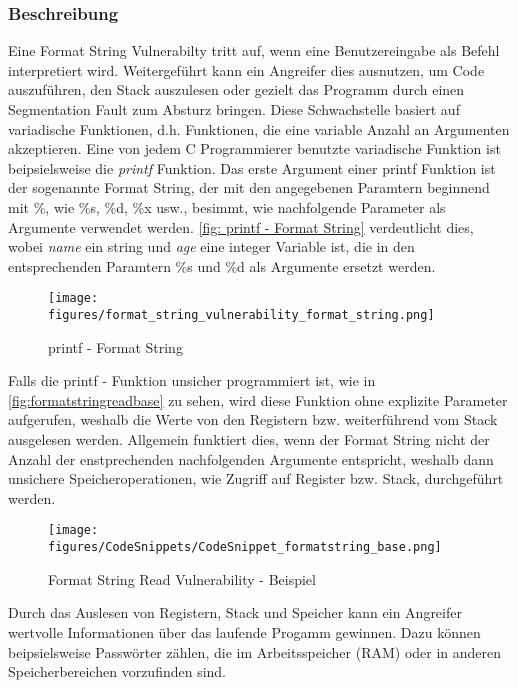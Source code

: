 \documentclass[a4paper,
DIV=13,
12pt,
BCOR=10mm,
department=FakIM,
oneside,
parskip=half,
automark,
listof=totocnumbered,
bibliography=totocnumbered,
acronym=totocnumbered
] {OTHRartcl}
\begin{document}
\subsubsection{Beschreibung}
Eine Format String Vulnerabilty tritt auf, wenn eine Benutzereingabe als Befehl interpretiert wird.
Weitergeführt kann ein Angreifer dies ausnutzen, um Code auszuführen, den Stack auszulesen oder gezielt das Programm durch einen Segmentation Fault zum Absturz bringen.
Diese Schwachstelle basiert auf variadische Funktionen, d.h. Funktionen, die eine variable Anzahl an Argumenten akzeptieren.
Eine von jedem C Programmierer benutzte variadische Funktion ist beipsielsweise die \textit{printf} Funktion. \cite{OWASP Format String Vuln.}
Das erste Argument einer printf Funktion ist der sogenannte Format String, der mit den angegebenen Paramtern beginnend mit \%, wie \%s, \%d, \%x usw., besimmt, wie nachfolgende Parameter
als Argumente verwendet werden.
\autoref{fig: printf - Format String} verdeutlicht dies, wobei \textit{name} ein string und \textit{age} eine integer Variable ist, die in den entsprechenden
Paramtern \%s und \%d als Argumente ersetzt werden.
\begin{figure}[ht!]
  \begin{center}
    \texttt{[image: figures/format\_string\_vulnerability\_format\_string.png]}
    \caption{printf - Format String}
    \label{fig: printf - Format String}
  \end{center}
\end{figure}

Falls die printf - Funktion unsicher programmiert ist, wie in \autoref{fig:formatstringreadbase} zu sehen,
wird diese Funktion ohne explizite Parameter aufgerufen, weshalb die Werte von den Registern bzw. weiterführend vom Stack ausgelesen werden.
Allgemein funktiert dies, wenn der Format String nicht der Anzahl der enstprechenden nachfolgenden Argumente entspricht, weshalb dann unsichere Speicheroperationen, wie Zugriff auf Register bzw. Stack,
durchgeführt werden.
\begin{figure}[ht!]
  \begin{center}
    \texttt{[image: figures/CodeSnippets/CodeSnippet\_formatstring\_base.png]}
    \caption{Format String Read Vulnerability - Beispiel}
    \label{fig:formatstringreadbase}
  \end{center}
\end{figure}
Durch das Auslesen von Registern, Stack und Speicher kann ein Angreifer wertvolle Informationen über das laufende Progamm gewinnen.
Dazu können beipsielsweise Passwörter zählen, die im Arbeitsspeicher (RAM) oder in anderen Speicherbereichen vorzufinden sind.
\end{document}
